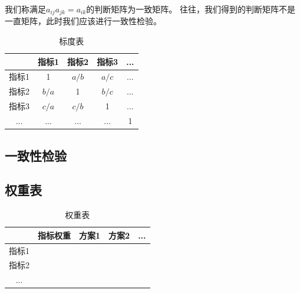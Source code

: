 \documentclass[UTF8]{article} %
\begin{document}
我们称满足$a_{ij} a_{jk} = a_{ik}$的判断矩阵为一致矩阵。
往往，我们得到的判断矩阵不是一直矩阵，此时我们应该进行一致性检验。

\begin{table}[ht]
    \centering
    \begin{tabular}{|c|c|c|c|c|}
        \hline
        & 指标1 & 指标2 & 指标3 & ... \\
        \hline
        指标1 & 1 & $a/b$ & $a/c$ & ... \\
        \hline
        指标2 & $b/a$ & 1 & $b/c$ & ... \\
        \hline
        指标3 & $c/a$ & $c/b$ & 1 & ... \\
        \hline
        ... & ... & ... & ... & 1 \\
        \hline
    \end{tabular}
    \caption{标度表}
    \label{tab:table}
\end{table}

\subsection{一致性检验}



\subsection{权重表}

\begin{table}[H]
    \centering
    \begin{tabular}{|c|c|c|c|c|}
        \hline
        & 指标权重 & 方案1 & 方案2 & ... \\
        \hline
        指标1 & & & &\\
        \hline
        指标2 & & & &\\
        \hline
        ... & & & &\\
        \hline
    \end{tabular}
    \caption{权重表}
    \label{tab:table}
\end{table}
\end{document}
